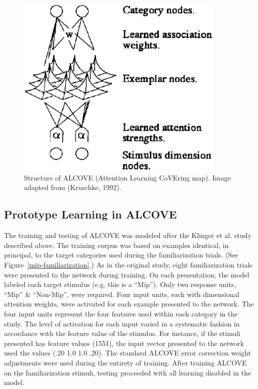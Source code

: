 \begin{figure}[ht]
\begin{center}
	\includegraphics[width=100mm]{figures/alcove.eps}
\end{center}
\caption{Structure of ALCOVE (Attention Learning CoVEring map).  Image adapted from (Kruschke, 1992).}
\label{alcove}
\end{figure} 

\subsection{Prototype Learning in ALCOVE}
The training and testing of ALCOVE was modeled after the Klinger et al. study described above.  The training corpus was based on examples identical, in principal, to the target categories used during the familiarization trials. (See Figure~\ref{mip-familiarization}.)  As in the original study, eight familiarization trials were presented to the network during training.  On each presentation, the model labeled each target stimulus (e.g. this is a ``Mip'').  Only two response units, ``Mip'' \& ``Non-Mip'', were required.  Four input units, each with dimensional attention weights, were activated for each example presented to the network.  The four input units represent the four features used within each category in the study.  The level of activation for each input varied in a systematic fashion in accordance with the feature value of the stimulus.  For instance, if the stimuli presented has feature values (1551), the input vector presented to the network used the values (.20 1.0 1.0 .20). The standard ALCOVE error correction weight adjustments were used during the entirety of training.   After training ALCOVE on the familiarization stimuli, testing proceeded with all learning disabled in the model.  

